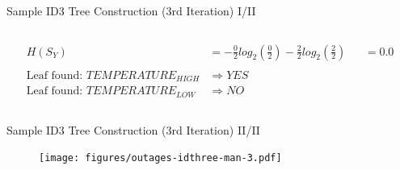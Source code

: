 \documentclass[document.tex]{subfiles}
\begin{document}
\begin{frame}{Sample ID3 Tree Construction (3rd Iteration) I/II}
\begin{columns}
\begin{column}{0.6\textwidth}
\begin{alignat*}{3}
                    H(S_Y) &= -\frac{0}{2}log_2(\frac{0}{2}) - \frac{2}{2}log_2(\frac{2}{2}) &&= 0.0 \\\\
                    \text{Leaf found: } TEMPERATURE_{HIGH} &\Rightarrow YES \\
                    \text{Leaf found: } TEMPERATURE_{LOW} &\Rightarrow NO
                \end{alignat*}
            \end{column}
        \end{columns}
    \end{frame}
        
    \begin{frame}{Sample ID3 Tree Construction (3rd Iteration) II/II}
        \begin{figure}
            \texttt{[image: figures/outages-idthree-man-3.pdf]}
        \end{figure}
    \end{frame}
        
\end{document}

